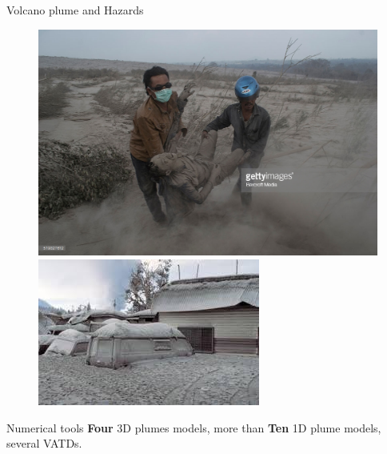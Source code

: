 \documentclass{beamer}
\begin{document}
\begin{frame}{Volcano plume and Hazards}
\begin{figure}[!t]
\begin{minipage}{.32\textwidth}
\end{minipage}
\begin{minipage}{.32\textwidth}
\center
\includegraphics[width=.95\textwidth]{./PPT/Ash_community4}
\end{minipage}
\begin{minipage}{.32\textwidth}
\center
\includegraphics[width=.95\textwidth]{./PPT/Ash_community3}
\end{minipage}
\end{figure}

\begin{block} {Numerical tools}
\textbf{Four} 3D plumes models, more than \textbf{Ten} 1D plume models, several VATDs.
\end{block}
\end{frame}
\end{document}

